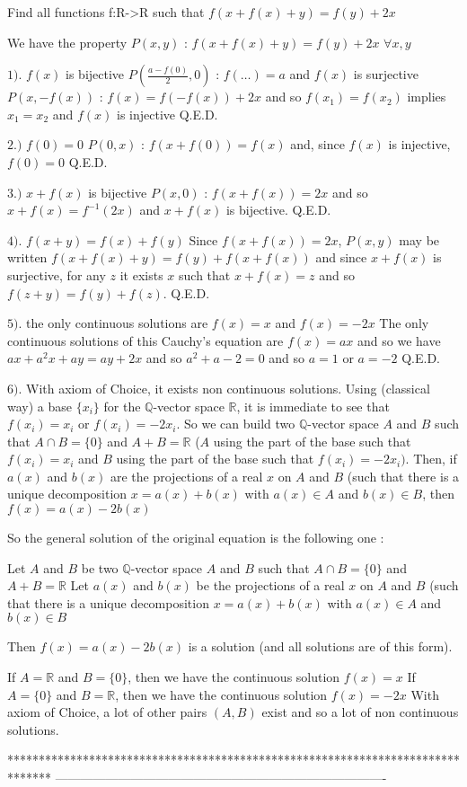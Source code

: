 \begin{mysolution}
	\begin{tcolorbox}Find all functions f:R->R such that $ f(x+f(x)+y)=f(y)+2x$\end{tcolorbox}

We have the property $ P(x,y)$ : $ f(x+f(x)+y)=f(y)+2x$ $ \forall x,y$

$ 1).$ $ f(x)$ is bijective
$ P(\frac{a-f(0)}{2},0)$ : $ f(\ldots)=a$ and $ f(x)$ is surjective
$ P(x,-f(x))$ : $ f(x)=f(-f(x))+2x$ and so $ f(x_{1})=f(x_{2})$ implies $ x_{1}=x_{2}$ and $ f(x)$ is injective
Q.E.D.

$ 2.)$ $ f(0)=0$
$ P(0,x)$ : $ f(x+f(0))=f(x)$ and, since $ f(x)$ is injective, $ f(0)=0$
Q.E.D.

$ 3.)$ $ x+f(x)$ is bijective
$ P(x,0)$ : $ f(x+f(x))=2x$ and so $ x+f(x)=f^{-1}(2x)$ and $ x+f(x)$ is bijective.
Q.E.D.

$ 4).$ $ f(x+y)=f(x)+f(y)$ 
Since $ f(x+f(x))=2x$, $ P(x,y)$ may be written $ f(x+f(x)+y)=f(y)+f(x+f(x))$ and since $ x+f(x)$ is surjective, for any $ z$ it exists $ x$ such that $ x+f(x)=z$ and so $ f(z+y)=f(y)+f(z)$.
Q.E.D.

$ 5).$ the only continuous solutions are $ f(x)=x$ and $ f(x)=-2x$
The only continuous solutions of this Cauchy's equation are $ f(x)=ax$ and so we have $ ax+a^{2}x+ay=ay+2x$ and so $ a^{2}+a-2=0$ and so $ a=1$ or $ a=-2$
Q.E.D.

$ 6).$ With axiom of Choice, it exists non continuous solutions.
Using (classical way) a base $ \{x_{i}\}$ for the $ \mathbb{Q}$-vector space $ \mathbb{R}$, it is immediate to see that $ f(x_{i})=x_{i}$ or $ f(x_{i})=-2x_{i}$.
So we can build two $ \mathbb{Q}$-vector space $ A$ and $ B$ such that $ A\cap B=\{0\}$ and $ A+B=\mathbb{R}$ ($ A$ using the part of the base such that $ f(x_{i})=x_{i}$ and $ B$ using the part of the base such that $ f(x_{i})=-2x_{i})$.
Then, if $ a(x)$ and $ b(x)$ are the projections of a real $ x$ on $ A$ and $ B$ (such that there is a unique decomposition $ x=a(x)+b(x)$ with $ a(x)\in A$ and $ b(x)\in B$, then $ f(x)=a(x)-2b(x)$


So the general solution of the original equation is the following one :

Let $ A$ and $ B$  be two $ \mathbb{Q}$-vector space $ A$ and $ B$ such that $ A\cap B=\{0\}$ and $ A+B=\mathbb{R}$
Let $ a(x)$ and $ b(x)$ be the projections of a real $ x$ on $ A$ and $ B$ (such that there is a unique decomposition $ x=a(x)+b(x)$ with $ a(x)\in A$ and $ b(x)\in B$

Then $ f(x)=a(x)-2b(x)$ is a solution (and all solutions are of this form).

If $ A=\mathbb{R}$ and $ B=\{0\}$, then we have the continuous solution $ f(x)=x$
If $ A=\{0\}$ and $ B=\mathbb{R}$, then we have the continuous solution $ f(x)=-2x$
With axiom of Choice, a lot of other pairs $ (A,B)$ exist and so a lot of non continuous solutions.
\end{mysolution}
*******************************************************************************
-------------------------------------------------------------------------------

